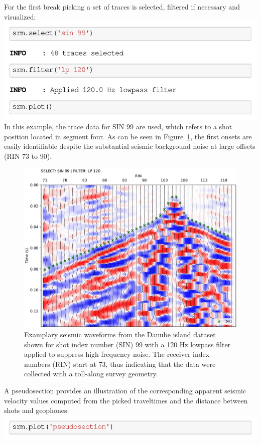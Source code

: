 \documentclass[a4paper,fleqn]{cas-sc}
\begin{document}
For the first break picking a set of traces is selected, filtered if necessary and visualized:
\newline
\includegraphics[width=.5\textwidth]{./figures/plotsin99_danube.pdf}
\newline
In this example, the trace data for SIN 99 are used, which refers to a shot position located in segment four. 
As can be seen in Figure~\ref{fig:rollalong_pickwindow}, the first onsets are easily identifiable despite the substantial seismic background noise at large offsets (RIN 73 to 90).
\begin{figure}
	\centering
	\includegraphics[width=.75\textwidth]{figures/danube_island_sin99_lp120_picks_vd.pdf}
	\caption{Examplary seismic waveforms from the Danube island dataset shown for shot index number (SIN) 99 with a 120 Hz lowpass filter applied to suppress high frequency noise. The receiver index numbers (RIN) start at 73, thus indicating that the data were collected with a roll-along survey geometry.}
	\label{fig:rollalong_pickwindow}
\end{figure}
A pseudosection provides an illustration of the corresponding apparent seismic velocity values computed from the picked traveltimes and the distance between shots and geophones:
\newline
\includegraphics[width=.5\textwidth]{./figures/plotpseudosection_danube.pdf}
\end{document}
